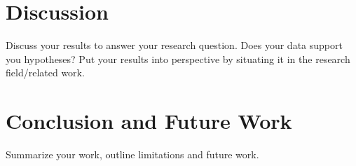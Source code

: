 \section{Discussion}
Discuss your results to answer your research question. Does your data support you hypotheses? Put your results into perspective by situating it in the research field/related work.

\section{Conclusion and Future Work}
Summarize your work, outline limitations and future work. 











